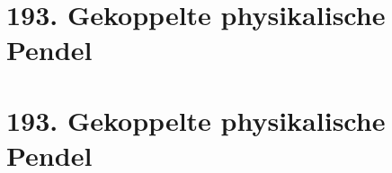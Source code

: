\documentclass{alex_hü}
\begin{document}
\renewcommand{\labelenumi}{\alph{enumi})}


\section*{193. Gekoppelte physikalische Pendel}

\section*{193. Gekoppelte physikalische Pendel}
\end{document}
